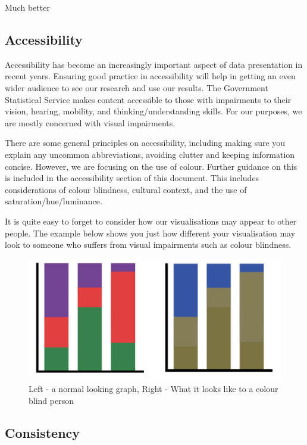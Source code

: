 \documentclass[
]{book}
\begin{document}
Much better

\hypertarget{accessibility}{%
\subsection{Accessibility}\label{accessibility}}

Accessibility has become an increasingly important aspect of data presentation in recent years. Ensuring good practice in accessibility will help in getting an even wider audience to see our research and use our results. The Government Statistical Service makes content accessible to those with impairments to their vision, hearing, mobility, and thinking/understanding skills. For our purposes, we are mostly concerned with visual impairments.

There are some general principles on accessibility, including making sure you explain any uncommon abbreviations, avoiding clutter and keeping information concise. However, we are focusing on the use of colour. Further guidance on this is included in the accessibility section of this document. This includes considerations of colour blindness, cultural context, and the use of saturation/hue/luminance.

It is quite easy to forget to consider how our visualisations may appear to other people. The example below shows you just how different your visualisation may look to someone who suffers from visual impairments such as colour blindness.

\begin{figure}
\centering
\includegraphics{img/colour blind comine.png}
\caption{Left - a normal looking graph, Right - What it looks like to a colour blind person}
\end{figure}

\hypertarget{consistency}{%
\subsection{Consistency}\label{consistency}}
\end{document}
